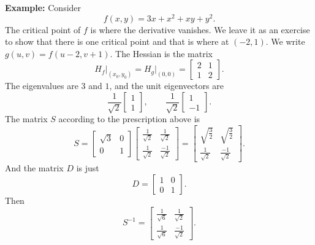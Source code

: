 \documentclass[12pt]{article}
\begin{document}
\bigskip

\textbf{Example:}
Consider
$$
f(x,y) = 3x+x^2+xy+y^2.
$$
The critical point of $f$ is where the derivative vanishes.  We leave it as
an exercise to show that there is one critical point and that is
where at $(-2,1)$.
We write $g(u,v) = f(u-2,v+1)$.  The Hessian is the matrix
\begin{equation*}
H_f\big|_{(x_0,y_0)} = H_g\big|_{(0,0)}
=
\begin{bmatrix}
2 & 1 \\
1 & 2
\end{bmatrix} .
\end{equation*}
The eigenvalues are $3$ and $1$, and the unit eigenvectors are 
\begin{equation*}
\frac{1}{\sqrt{2}}
\begin{bmatrix}
1 \\
1
\end{bmatrix} , \qquad
\frac{1}{\sqrt{2}}
\begin{bmatrix}
1 \\
-1
\end{bmatrix} .
\end{equation*}
The matrix $S$ according to the prescription above is
\begin{equation*}
S =
\begin{bmatrix}
\sqrt{3} & 0 \\
0 & 1
\end{bmatrix}
\begin{bmatrix}
\frac{1}{\sqrt{2}} &
\frac{1}{\sqrt{2}} \\
\frac{1}{\sqrt{2}} &
\frac{-1}{\sqrt{2}} 
\end{bmatrix}
=
\begin{bmatrix}
\sqrt{\frac{3}{2}} &
\sqrt{\frac{3}{2}} \\
\frac{1}{\sqrt{2}} &
\frac{-1}{\sqrt{2}} 
\end{bmatrix} .
\end{equation*}
And the matrix $D$ is just
\begin{equation*}
D =
\begin{bmatrix}
1 & 0 \\
0 & 1
\end{bmatrix} .
\end{equation*}
Then
\begin{equation*}
S^{-1} =
\begin{bmatrix}
\frac{1}{\sqrt{6}} &
\frac{1}{\sqrt{2}} \\
\frac{1}{\sqrt{6}} &
\frac{-1}{\sqrt{2}}
\end{bmatrix} .
\end{equation*}
\end{document}
